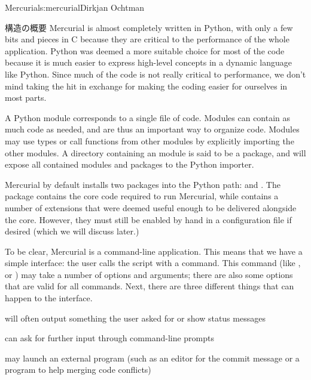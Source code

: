 \begin{aosachapter}{Mercurial}{s:mercurial}{Dirkjan Ochtman}
\begin{aosasect1}{構造の概要}
Mercurial is almost completely written in Python, with only a few bits
and pieces in C because they are critical to the performance of the
whole application. Python was deemed a more suitable choice for most
of the code because it is much easier to express high-level concepts
in a dynamic language like Python. Since much of the code is not
really critical to performance, we don't mind taking the hit in
exchange for making the coding easier for ourselves in most parts.

A Python module corresponds to a single file of code. Modules can
contain as much code as needed, and are thus an important way to
organize code. Modules may use types or call functions from other
modules by explicitly importing the other modules. A directory
containing an  module is said to be a package,
and will expose all contained modules and packages to the Python
importer.

Mercurial by default installs two packages into the Python path:
 and . The  package
contains the core code required to run Mercurial, while 
contains a number of extensions that were deemed useful enough to be
delivered alongside the core. However, they must still be enabled by
hand in a configuration file if desired (which we will discuss later.)

To be clear, Mercurial is a command-line application. This means that
we have a simple interface: the user calls the  script with a
command. This command (like ,  or )
may take a number of options and arguments; there are also some
options that are valid for all commands. Next, there are three
different things that can happen to the interface.

\begin{aosaitemize}

  \item {} will often output something the user asked for or show
  status messages

  \item {} can ask for further input through command-line prompts

  \item {} may launch an external program (such as an editor for the
  commit message or a program to help merging code conflicts)

\end{aosaitemize}



\end{aosasect1}
\end{aosachapter}
